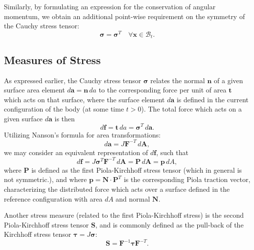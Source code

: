 Similarly, by formulating an expression for the conservation of angular momentum, we obtain an additional point-wise requirement on the symmetry of the Cauchy stress tensor:
\begin{equation}
  \boldsymbol{\sigma} = \boldsymbol{\sigma}^T \quad \forall \mathbf{x} \in \mathcal{B}_t.
\end{equation}

\subsection*{Measures of Stress}

As expressed earlier, the Cauchy stress tensor $\boldsymbol{\sigma}$ relates the normal $\mathbf{n}$ of a given surface area element $d \mathbf{a} = \mathbf{n} \, da$ to the corresponding force per unit of area $\mathbf{t}$ which acts on that surface, where the surface element $d \mathbf{a}$ is defined in the current configuration of the body (at some time $t > 0$). The total force which acts on a given surface $d \mathbf{a}$ is then
\begin{equation}
  d \mathbf{f} = \mathbf{t} \, da = \boldsymbol{\sigma}^T \, d \mathbf{a}.
\end{equation}
Utilizing Nanson's formula for area transformations:
\begin{equation}
  d \mathbf{a} = J \mathbf{F}^{-T} \, d \mathbf{A},
\end{equation}
we may consider an equivalent representation of $d \mathbf{f}$, such that
\begin{equation}
  d \mathbf{f} = J \boldsymbol{\sigma}^T \mathbf{F}^{-T} \, d \mathbf{A} = \mathbf{P} \, d \mathbf{A} = \mathbf{p} \, dA,
\end{equation}
where $\mathbf{P}$ is defined as the first Piola-Kirchhoff stress tensor (which in general is not symmetric.), and where $\mathbf{p} = \mathbf{N} \cdot \mathbf{P}^T$ is the corresponding Piola traction vector, characterizing the distributed force which acts over a surface defined in the reference configuration with area $dA$ and normal $\mathbf{N}$.

Another stress measure (related to the first Piola-Kirchhoff stress) is the second Piola-Kirchhoff stress tensor $\mathbf{S}$, and is commonly defined as the pull-back of the Kirchhoff stress tensor $\boldsymbol{\tau} = J \boldsymbol{\sigma}$:
\begin{equation}
  \mathbf{S} = \mathbf{F}^{-1} \boldsymbol{\tau} \mathbf{F}^{-T}.
\end{equation}

